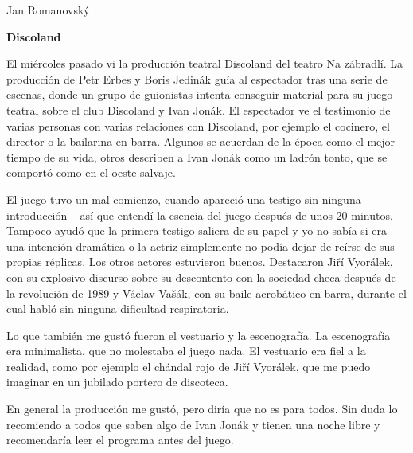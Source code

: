 \documentclass{article}
\begin{document}
\hfill Jan Romanovský
\begin{center}
    \textbf{Discoland}
\end{center}


El miércoles pasado vi la producción teatral Discoland del teatro Na zábradlí. La producción de Petr Erbes y Boris Jedinák guía al espectador tras una serie de escenas, donde un grupo de guionistas intenta conseguir material para su juego teatral sobre el club Discoland y Ivan Jonák. El espectador ve el testimonio de varias personas con varias relaciones con Discoland, por ejemplo el cocinero, el director o la bailarina en barra. Algunos se acuerdan de la época como el mejor tiempo de su vida, otros describen a Ivan Jonák como un ladrón tonto, que se comportó como en el oeste salvaje.

El juego tuvo un mal comienzo, cuando apareció una testigo sin ninguna introducción – así que entendí la esencia del juego después de unos 20 minutos. Tampoco ayudó que la primera testigo saliera de su papel y yo no sabía si era una intención dramática o la actriz simplemente no podía dejar de reírse de sus propias réplicas. Los otros actores estuvieron buenos. Destacaron Jiří Vyorálek, con su explosivo discurso sobre su descontento con la sociedad checa después de la revolución de 1989 y Václav Vašák, con su baile acrobático en barra, durante el cual habló sin ninguna dificultad respiratoria.

Lo que también me gustó fueron el vestuario y la escenografía. La escenografía era minimalista, que no molestaba el juego nada. El vestuario era fiel a la realidad, como por ejemplo el chándal rojo de Jiří Vyorálek, que me puedo imaginar en un jubilado portero de discoteca.

En general la producción me gustó, pero diría que no es para todos. Sin duda lo recomiendo a todos que saben algo de Ivan Jonák y tienen una noche libre y recomendaría leer el programa antes del juego.
\end{document}
